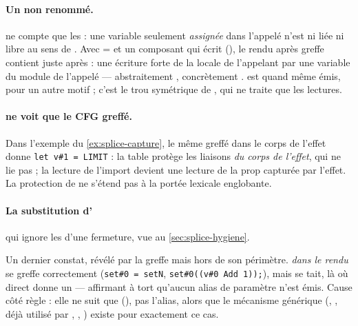 \paragraph{Un  non renommé.}  ne compte que les  : une variable seulement \emph{assignée} dans l'appelé n'est ni liée ni libre au sens de . Avec  =  et un composant qui écrit  (), le rendu après greffe contient  juste après  : une écriture forte de la locale de l'appelant par une variable du module de l'appelé --- abstraitement , concrètement .  est quand même émis, pour un autre motif ; c'est le trou symétrique de , qui ne traite que les lectures.

\paragraph{ ne voit que le CFG greffé.} Dans l'exemple du \cref{ex:splice-capture}, le même  greffé dans le corps de l'effet donne \texttt{let v\#1 = LIMIT} : la table protège les liaisons \emph{du corps de l'effet}, qui ne lie pas  ; la lecture de l'import devient une lecture de la prop capturée par l'effet. La protection de  ne s'étend pas à la portée lexicale englobante.

\paragraph{La substitution d'} qui ignore les  d'une fermeture, vue au \cref{sec:splice-hygiene}.

\begin{remarque}
Un dernier constat, révélé par la greffe mais hors de son périmètre.  \emph{dans le rendu} se greffe correctement (\texttt{set\#0 = setN}, \texttt{set\#0((v\#0 Add 1));}), mais  se tait, là où  direct donne un \Error{} ---  affirmant à tort qu'aucun alias de paramètre n'est émis. Cause côté règle : elle ne suit que  (), pas l'alias, alors que le mécanisme générique (, , déjà utilisé par , , ) existe pour exactement ce cas.
\end{remarque}

